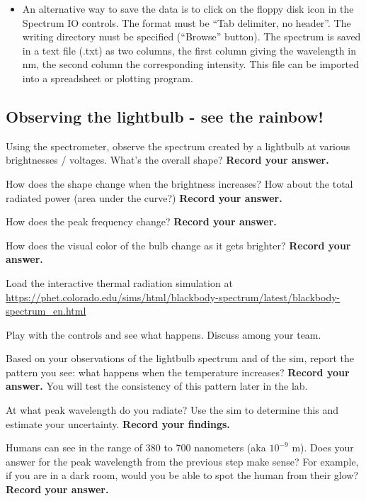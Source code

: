 \begin{itemize}
\begin{itemize}
	\item An alternative way to save the data is to click on the floppy disk icon in the
	Spectrum IO controls. The format must be ``Tab delimiter, no header''. The
	writing directory must be specified (``Browse'' button). The spectrum is saved in a
	text file (.txt) as two columns, the first column giving the wavelength in nm, the
	second column the corresponding intensity. This file can be imported into a spreadsheet or plotting program.
	\end{itemize}
\end{itemize}

\subsection{Observing the lightbulb - see the rainbow!}\label{ic:sec:exploring}

\begin{steps}
	
	\item\label{ic:it:spec1} Using the spectrometer, observe the spectrum created by a lightbulb at various brightnesses / voltages.  What's the overall shape? \textbf{Record your answer.}
	
	\item How does the shape change when the brightness increases? How about the total radiated power (area under the curve?) \textbf{Record your answer.}
	
	\item How does the peak frequency change? \textbf{Record your answer.}
	
	\item\label{ic:it:spec2} How does the visual color of the bulb change as it gets brighter? \textbf{Record your answer.}

	\item\label{ic:step:load-sim} Load the interactive thermal radiation simulation
	at
	\url{https://phet.colorado.edu/sims/html/blackbody-spectrum/latest/blackbody-spectrum_en.html}
	
	\item Play with the controls and see what happens. Discuss among your team.
	
	\item\label{ic:step:pattern} Based on your observations of the lightbulb spectrum and of the sim, report the pattern you see: what happens when the temperature increases? \textbf{Record your answer.} You will test the consistency of this pattern later in the lab.
	
	\item\label{ic:it:human1} At what peak wavelength do you radiate? Use the sim to determine this and 
	estimate your uncertainty. \textbf{Record your findings.}
	
	\item\label{ic:it:human2} Humans can see in the range of 380 to 700 nanometers (aka $10^{-9}$ m). Does your answer for the peak wavelength from the previous step make sense? For example, if you are in a dark room, would you be able to spot the human from their glow? \textbf{Record your answer.}

\end{steps}

